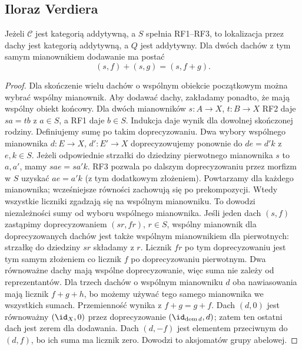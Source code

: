 \subsection{Iloraz Verdiera}
\begin{lemat}\label{cat:lem:additive-localization}
Jeżeli $\mathcal C$ jest kategorią addytywną, a $S$ spełnia RF1--RF3, to lokalizacja przez dachy jest kategorią addytywną, a $Q$ jest addytywny. Dla dwóch dachów z tym samym mianownikiem dodawanie ma postać
\[
 (s,f)+(s,g)=(s,f+g).
\]
\end{lemat}
\begin{proof}
Dla skończenie wielu dachów o wspólnym obiekcie początkowym można wybrać wspólny mianownik. Aby dodawać dachy, zakładamy ponadto, że mają wspólny obiekt końcowy. Dla dwóch mianowników $s:A\to X$, $t:B\to X$ RF2 daje $sa=tb$ z $a\in S$, a RF1 daje $b\in S$. Indukcja daje wynik dla dowolnej skończonej rodziny. Definiujemy sumę po takim doprecyzowaniu. Dwa wybory wspólnego mianownika $d:E\to X$, $d':E'\to X$ doprecyzowujemy ponownie do $de=d'k$ z $e,k\in S$. Jeżeli odpowiednie strzałki do dziedziny pierwotnego mianownika $s$ to $a,a'$, mamy $sae=sa'k$. RF3 pozwala po dalszym doprecyzowaniu przez morfizm w $S$ uzyskać $ae=a'k$ (z tym dodatkowym złożeniem). Powtarzamy dla każdego mianownika; wcześniejsze równości zachowują się po prekompozycji. Wtedy wszystkie liczniki zgadzają się na wspólnym mianowniku. To dowodzi niezależności sumy od wyboru wspólnego mianownika. Jeśli jeden dach $(s,f)$ zastąpimy doprecyzowaniem $(sr,fr)$, $r\in S$, wspólny mianownik dla doprecyzowanych dachów jest także wspólnym mianownikiem dla pierwotnych: strzałkę do dziedziny $sr$ składamy z $r$. Licznik $fr$ po tym doprecyzowaniu jest tym samym złożeniem co licznik $f$ po doprecyzowaniu pierwotnym. Dwa równoważne dachy mają wspólne doprecyzowanie, więc suma nie zależy od reprezentantów. Dla trzech dachów o wspólnym mianowniku $d$ oba nawiasowania mają licznik $f+g+h$, bo możemy używać tego samego mianownika we wszystkich sumach. Przemienność wynika z $f+g=g+f$. Dach $(d,0)$ jest równoważny $(\id_X,0)$ przez doprecyzowanie $(\id_{\operatorname{dom}d},d)$; zatem ten ostatni dach jest zerem dla dodawania. Dach $(d,-f)$ jest elementem przeciwnym do $(d,f)$, bo ich suma ma licznik zero. Dowodzi to aksjomatów grupy abelowej.


\end{proof}
